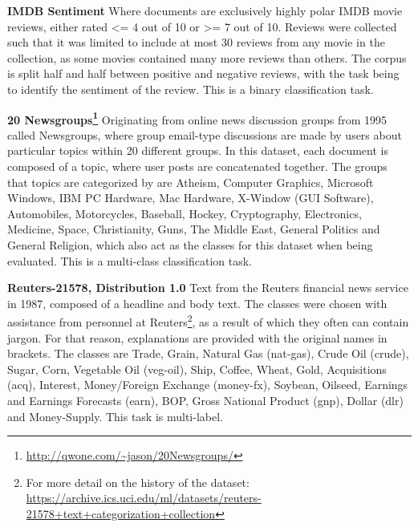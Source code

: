 \textbf{IMDB Sentiment} Where documents are exclusively highly polar IMDB movie reviews, either rated <= 4 out of 10 or >= 7 out of 10. Reviews were collected such that it was limited to include at most 30 reviews from any movie in the collection, as some movies contained many more reviews than others. The corpus is split half and half between positive and negative reviews, with the task being to identify the sentiment of the review. This is a binary classification task.

\textbf{20 Newsgroups\footnote{\url{http://qwone.com/~jason/20Newsgroups/}}} Originating from online news discussion groups from 1995 called Newsgroups, where group email-type discussions are made by users about particular topics within 20 different groups. In this dataset, each document is composed of a topic, where user posts are concatenated together. The groups that topics are categorized by are Atheism, Computer Graphics, Microsoft Windows, IBM PC Hardware, Mac Hardware, X-Window (GUI Software), Automobiles, Motorcycles, Baseball, Hockey, Cryptography, Electronics, Medicine, Space, Christianity, Guns, The Middle East, General Politics and General Religion, which also act as the classes for this dataset when being evaluated. This is a multi-class classification task. %

\textbf{Reuters-21578, Distribution 1.0}  Text from the Reuters financial news service in 1987, composed of a headline and body text. The classes were chosen with assistance from personnel at Reuters\footnote{For more detail on the history of the dataset: \url{https://archive.ics.uci.edu/ml/datasets/reuters-21578+text+categorization+collection}}, as a result of which they often can contain jargon. For that reason, explanations are provided with the original names in brackets. The classes are Trade, Grain, Natural Gas (nat-gas), Crude Oil (crude), Sugar, Corn, Vegetable Oil (veg-oil), Ship, Coffee, Wheat, Gold, Acquisitions (acq), Interest, Money/Foreign Exchange (money-fx), Soybean, Oilseed, Earnings and Earnings Forecasts (earn), BOP, Gross National Product (gnp), Dollar (dlr) and Money-Supply.   This task is multi-label. 

